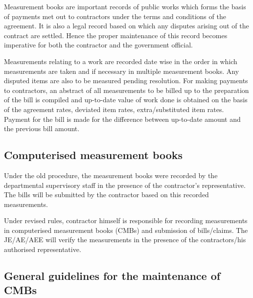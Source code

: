 \documentclass[twoside,a4paper]{refart}
\begin{document}
	 Measurement books are important records of public works which forms the basis of payments met out to contractors under the terms and conditions of the agreement. It is also a legal record based on which any disputes arising out of the contract are settled. Hence the proper maintenance of this record becomes imperative for both the contractor and the government official.
	 
	 Measurements relating to a work are recorded date wise in the order in which measurements are taken and if necessary in multiple measurement books. Any disputed items are also to be measured pending resolution. For making payments to contractors, an abstract of all measurements to be billed up to the preparation of the bill is compiled and up-to-date value of work done is obtained on the basis of the agreement rates, deviated item rates, extra/substituted item rates. Payment for the bill is made for the difference between up-to-date amount and the previous bill amount.
	 
	 \subsection{Computerised measurement books}
	 
	 Under the old procedure, the measurement books were recorded by the departmental supervisory staff in the presence of the contractor's representative. The bills will be submitted by the contractor based on this recorded measurements.
	 
	 Under revised rules, contractor himself is responsible for recording measurements in computerised measurement books (CMBs) and submission of bills/claims. The JE/AE/AEE will verify the measurements in the presence of the contractors/his authorised representative. 
	 
	 \subsection{General guidelines for the maintenance of CMBs}
	 
\end{document}
